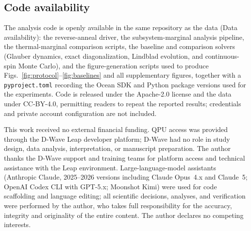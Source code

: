 \documentclass[aps,prapplied,reprint,superscriptaddress,floatfix,nofootinbib]{revtex4-2}
\begin{document}
\subsection{Code availability}

The analysis code is openly available in the same repository as the data (Data availability): the reverse-anneal driver, the subsystem-marginal analysis pipeline, the thermal-marginal comparison scripts, the baseline and comparison solvers (Glauber dynamics, exact diagonalization, Lindblad evolution, and continuous-spin Monte Carlo), and the figure-generation scripts used to produce Figs.~\ref{fig:protocol}--\ref{fig:baselines} and all supplementary figures, together with a \texttt{pyproject.toml} recording the Ocean SDK and Python package versions used for the experiments.
Code is released under the Apache-2.0 license and the data under CC-BY-4.0, permitting readers to repeat the reported results; credentials and private account configuration are not included.

\begin{acknowledgments}
This work received no external financial funding.  QPU access was provided through the D-Wave Leap developer platform; D-Wave had no role in study design, data analysis, interpretation, or manuscript preparation.  The author thanks the D-Wave support and training teams for platform access and technical assistance with the Leap environment.  Large-language-model assistants (Anthropic Claude, 2025--2026 versions including Claude Opus~4.x and Claude~5; OpenAI Codex CLI with GPT-5.x; Moonshot Kimi) were used for code scaffolding and language editing; all scientific decisions, analyses, and verification were performed by the author, who takes full responsibility for the accuracy, integrity and originality of the entire content.  The author declares no competing interests.
\end{acknowledgments}



\end{document}
